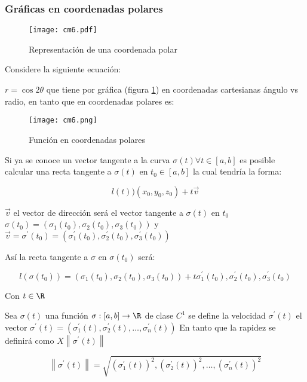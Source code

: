 \subsubsection{Gráficas en coordenadas polares}


\begin{figure}[h!]
	\centering
	\texttt{[image: cm6.pdf]}
	\caption{Representación de una coordenada polar}
\end{figure}

Considere la siguiente ecuación:

$r=\cos{2\theta}$ que tiene por gráfica (figura \ref{cm6}) en coordenadas cartesianas ángulo vs radio,
en tanto que en coordenadas polares es:


\begin{figure}[h!]
	\centerline{\texttt{[image: cm6.png]}}
	\caption{Función en coordenadas polares}
	\label{cm6}
\end{figure}



Si ya se conoce un vector tangente a la curva $\sigma(t)\forall t\in \left[a,b\right]$
es posible calcular una recta tangente a $\sigma(t)$ en $t_0\in\left[a,b\right]$
la cual tendría la forma:

\begin{equation*}
	l(t))\left(x_0,y_0,z_0\right)+t\overrightarrow{v}
\end{equation*}

$\overrightarrow{v}$ el vector de dirección será el vector tangente a $\sigma(t)$
en $t_0$ $\sigma(t_0)=\left(\sigma_1(t_0),\sigma_2(t_0),\sigma_3(t_0)\right)$
y $\overrightarrow{v}=\sigma^{\prime}(t_0)=\left(\sigma^{\prime}_1(t_0),\sigma^{\prime}_2(t_0),\sigma^{\prime}_3(t_0)\right)$

Así la recta tangente a $\sigma$ en $\sigma(t_0)$ será:

\begin{equation}
	l\left(\sigma(t_0)\right)=\left(\sigma_1(t_0),\sigma_2(t_0),\sigma_3(t_0)\right)+t\sigma^{\prime}_1(t_0),\sigma^{\prime}_2(t_0),\sigma^{\prime}_3(t_0)
\end{equation}

Con $t\in \R$

\begin{definition}[Rapidez]
	Sea $\sigma(t)$ una función $\sigma:\left[a,b\right]\to \R$ de
	clase $C^1$ se define la velocidad $\sigma^{\prime}(t)$ el vector
	$\sigma^{\prime}(t)=\left(\sigma_1^{\prime}(t),\sigma_2^{\prime}(t),\dots ,\sigma_{n}^{\prime}(t)\right)$
	En tanto que la rapidez se definirá como $X\left\lVert \sigma^{\prime}(t)\right\rVert$

	\begin{equation}
		\left\lVert \sigma^{\prime}(t)\right\rVert=\sqrt{\left(\sigma_1^{\prime}(t)\right)^2,\left(\sigma_2^{\prime}(t)\right)^2,\dots ,\left(\sigma_{n}^{\prime}(t)\right)^2}
	\end{equation}

\end{definition}



